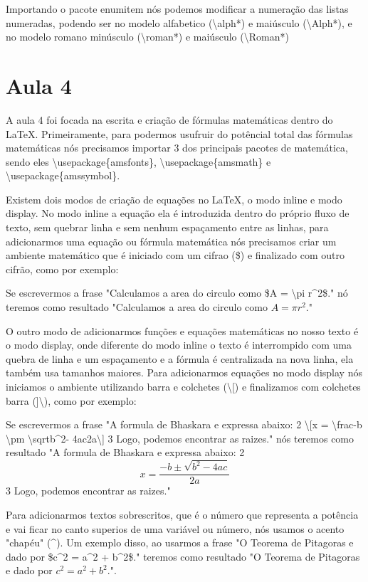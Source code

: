 Importando o pacote enumitem nós podemos modificar a numeração das listas numeradas, podendo ser no modelo alfabetico (\textbackslash alph*) e maiúsculo (\textbackslash Alph*), e no modelo romano minúsculo (\textbackslash roman*) e maiúsculo (\textbackslash Roman*) 

\section{Aula 4}
A aula 4 foi focada na escrita e criação de fórmulas matemáticas dentro do \LaTeX. Primeiramente, para podermos usufruir do potêncial total das fórmulas matemáticas nós precisamos importar 3 dos principais pacotes de matemática, sendo eles \textbackslash usepackage\{amsfonts\}, \textbackslash usepackage\{amsmath\} e \textbackslash usepackage\{amssymbol\}.

Existem dois modos de criação de equações no \LaTeX, o modo inline e modo display. No modo inline a equação ela é introduzida dentro do próprio fluxo de texto, sem quebrar linha e sem nenhum espaçamento entre as linhas, para adicionarmos uma equação ou fórmula matemática nós precisamos criar um ambiente matemático que é iniciado com um cifrao (\$) e finalizado com outro cifrão, como por exemplo:

Se escrevermos a frase "Calculamos a area do circulo como \$A = \textbackslash pi r\^{}2\$." nó teremos como resultado "Calculamos a area do circulo como $A = \pi r^2$."

O outro modo de adicionarmos funções e equações matemáticas no nosso texto é o modo display, onde diferente do modo inline o  texto é interrompido com uma quebra de linha e um espaçamento e a fórmula é centralizada na nova linha, ela também usa tamanhos maiores. Para adicionarmos equações no modo display nós iniciamos o ambiente utilizando barra e colchetes (\textbackslash[) e finalizamos com colchetes barra (]\textbackslash), como por exemplo:

Se escrevermos a frase "A formula de Bhaskara e expressa abaixo: 2 \textbackslash [x = \textbackslash frac{-b \textbackslash pm \textbackslash sqrt{b\^{}2- 4ac}}{2a}\textbackslash ] 3 Logo, podemos encontrar as raizes." nós teremos como resultado "A formula de Bhaskara e expressa abaixo: 2 \[x = \frac{-b \pm \sqrt{b^2- 4ac}}{2a}\] 3 Logo, podemos encontrar as raizes."

Para adicionarmos textos sobrescritos, que é o número que representa a potência e vai ficar no canto superios de uma variável ou número, nós usamos o acento "chapéu" (\^{}). Um exemplo disso, ao usarmos a frase "O Teorema de Pitagoras e dado por \$c\^{}2 = a\^{}2 + b\^{}2\$." teremos como resultado "O Teorema de Pitagoras e dado por $c^2 = a^2 + b^2$.".


